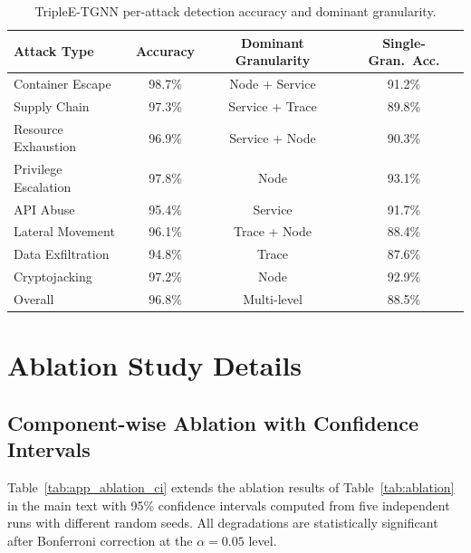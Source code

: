 \begin{table}[htbp]
\centering
\caption{TripleE-TGNN per-attack detection accuracy and dominant granularity.}
\label{tab:app_triplee_peratk}
\begin{tabular}{lccc}
\toprule
Attack Type & Accuracy & Dominant Granularity & Single-Gran.\ Acc. \\
\midrule
Container Escape     & 98.7\% & Node + Service & 91.2\% \\
Supply Chain         & 97.3\% & Service + Trace & 89.8\% \\
Resource Exhaustion  & 96.9\% & Service + Node & 90.3\% \\
Privilege Escalation & 97.8\% & Node & 93.1\% \\
API Abuse            & 95.4\% & Service & 91.7\% \\
Lateral Movement     & 96.1\% & Trace + Node & 88.4\% \\
Data Exfiltration    & 94.8\% & Trace & 87.6\% \\
Cryptojacking        & 97.2\% & Node & 92.9\% \\
\midrule
Overall              & 96.8\% & Multi-level & 88.5\% \\
\bottomrule
\end{tabular}
\end{table}


\section{Ablation Study Details}
\label{app:ablation_detail}

\subsection{Component-wise Ablation with Confidence Intervals}
\label{app:component_ablation}

Table~\ref{tab:app_ablation_ci} extends the ablation results of Table~\ref{tab:ablation} in the main text with 95\% confidence intervals computed from five independent runs with different random seeds. All degradations are statistically significant after Bonferroni correction at the $\alpha=0.05$ level.


